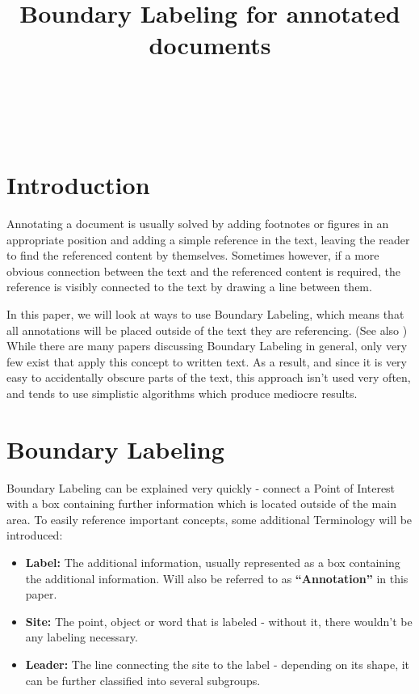 \documentclass[11pt,a4paper]{article}
\title{Boundary Labeling for annotated documents}%
\author{
 \authorname{Jakob Klinger} \\
 \studentnumber{1125755} \\
 \curriculum{033 534} \\
 \email{e1125755@student.tuwien.ac.at}
}
\begin{document}
\maketitle


\section{Introduction}
Annotating a document is usually solved by adding footnotes or figures in an appropriate position and adding a simple reference in the text, leaving the reader to find the referenced content by themselves. Sometimes however, if a more obvious connection between the text and the referenced content is required, the reference is visibly connected to the text by drawing a line between them.

In this paper, we will look at ways to use Boundary Labeling, which means that all annotations will be placed outside of the text they are referencing. (See also \cite{Bekos2007}) While there are many papers discussing Boundary Labeling in general, only very few exist that apply this concept to written text. As a result, and since it is very easy to accidentally obscure parts of the text, this approach isn't used very often, and tends to use simplistic algorithms which produce mediocre results.

\section{Boundary Labeling}
Boundary Labeling can be explained very quickly -  connect a Point of Interest with a box containing further information which is located outside of the main area. To easily reference important concepts, some additional Terminology will be introduced:

\begin{itemize}
\item \textbf{Label:} The additional information, usually represented as a box containing the additional information. Will also be referred to as \textbf{``Annotation''} in this paper.
\item \textbf{Site:} The point, object or word that is labeled - without it, there wouldn't be any labeling necessary.%
\item \textbf{Leader:} The line connecting the site to the label - depending on its shape, it can be further classified into several subgroups.
\end{itemize}
\end{document}
